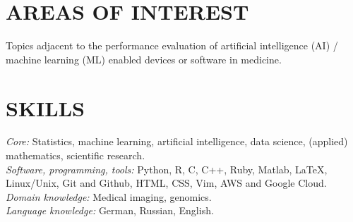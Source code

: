 \documentclass[overlapped, line, 10pt]{res} %
\begin{document}


\address{
  Web: \href{http://www.alexejgossmann.com/}{alexejgossmann.com} \textbar
  LinkedIn: \href{https://www.linkedin.com/in/alexejgossmann/}{alexejgossmann} \textbar
  Github: \href{https://github.com/agisga}{agisga} \textbar
  Email: \href{mailto:agossman@tulane.edu}{agossman@tulane.edu}
}


\begin{resume}




\section{AREAS OF INTEREST}

Topics adjacent to the performance evaluation of artificial intelligence (AI) / machine learning (ML) enabled devices or software in medicine.


\section{SKILLS}

{\sl Core:} Statistics, machine learning, artificial intelligence, data science, (applied) mathematics, scientific research.\\
{\sl Software, programming, tools:} Python, R, C, C++, Ruby, Matlab, \LaTeX, Linux/Unix, Git and Github, HTML, CSS, Vim, AWS and Google Cloud.\\
{\sl Domain knowledge:} Medical imaging, genomics.\\
{\sl Language knowledge:} German, Russian, English.


\end{resume}
\end{document}
